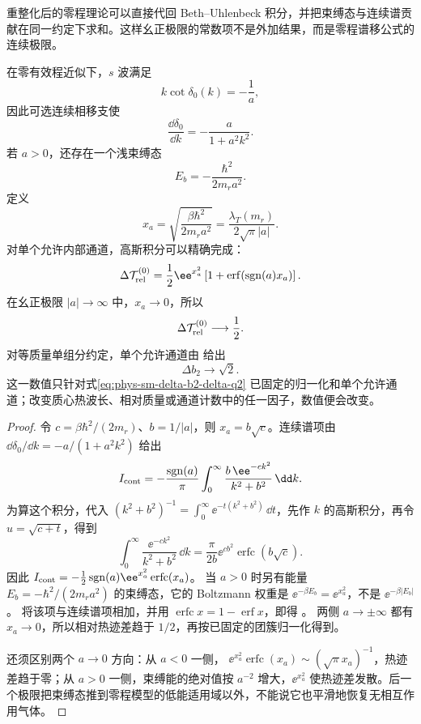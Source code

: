 重整化后的零程理论可以直接代回 Beth--Uhlenbeck 积分，并把束缚态与连续谱贡献在同一约定下求和。这样幺正极限的常数项不是外加结果，而是零程谱移公式的连续极限。

在零有效程近似下，\(s\) 波满足
\[
 k\cot\delta_0(k)=-\frac1a,
\]
因此可选连续相移支使
\[
 \frac{\dd\delta_0}{\dd k}
 =-\frac{a}{1+a^2k^2}.
\]
若 \(a>0\)，还存在一个浅束缚态
\[
 E_b=-\frac{\hbar^2}{2m_r a^2}.
\]
定义
\begin{equation}
 x_a=\sqrt{\frac{\beta\hbar^2}{2m_r a^2}}
 =\frac{\lambda_T(m_r)}{2\sqrt\pi|a|}.
 \label{eq:phys-sm-zero-range-x}
\end{equation}
对单个允许内部通道，高斯积分可以精确完成：
\begin{equation}
 \Delta\mathcal T_{\rm rel}^{(0)}
 =\frac12\ee^{x_a^2}
 \left[1+\operatorname{erf}(\operatorname{sgn}(a)x_a)\right].
 \label{eq:phys-sm-zero-range-bu-closed}
\end{equation}
在幺正极限 \(|a|\to\infty\) 中，\(x_a\to0\)，所以
\begin{equation}
 \Delta\mathcal T_{\rm rel}^{(0)}\longrightarrow\frac12.
 \label{eq:phys-sm-unitary-relative-trace}
\end{equation}
对等质量单组分约定，单个允许通道由 给出
\begin{equation}
 \Delta b_2\longrightarrow\sqrt2.
 \label{eq:phys-sm-unitary-b2-check}
\end{equation}
这一数值只针对式\cref{eq:phys-sm-delta-b2-delta-q2} 已固定的归一化和单个允许通道；改变质心热波长、相对质量或通道计数中的任一因子，数值便会改变。

\begin{proof}
令 \(c=\beta\hbar^2/(2m_r)\)、\(b=1/|a|\)，则 \(x_a=b\sqrt c\)。连续谱项由 \(\dd\delta_0/\dd k=-a/(1+a^2k^2)\) 给出
\[
I_{\rm cont}
=-\frac{\operatorname{sgn}(a)}{\pi}
\int_0^\infty\frac{b\,\ee^{-ck^2}}{k^2+b^2}\,\dd k.
\]
为算这个积分，代入
\((k^2+b^2)^{-1}=\int_0^\infty\ee^{-t(k^2+b^2)}\,\dd t\)，先作 \(k\) 的高斯积分，再令 \(u=\sqrt{c+t}\)，得到
\[
\int_0^\infty\frac{\ee^{-ck^2}}{k^2+b^2}\,\dd k
=\frac{\pi}{2b}\ee^{cb^2}\operatorname{erfc}(b\sqrt c).
\]
因此 \(I_{\rm cont}=-\tfrac12\operatorname{sgn}(a)
\ee^{x_a^2}\operatorname{erfc}(x_a)\)。
当 \(a>0\) 时另有能量 \(E_b=-\hbar^2/(2m_ra^2)\) 的束缚态，它的 Boltzmann 权重是
\(\ee^{-\beta E_b}=\ee^{x_a^2}\)，不是
\(\ee^{-\beta|E_b|}\)。
将该项与连续谱项相加，并用
\(\operatorname{erfc}x=1-\operatorname{erf}x\)，即得
。
两侧 \(a\to\pm\infty\) 都有 \(x_a\to0\)，所以相对热迹差趋于 \(1/2\)，再按已固定的团簇归一化得到。

还须区别两个 \(a\to0\) 方向：从 \(a<0\) 一侧，
\(\ee^{x_a^2}\operatorname{erfc}(x_a)\sim(\sqrt\pi x_a)^{-1}\)，热迹差趋于零；从 \(a>0\) 一侧，束缚能的绝对值按 \(a^{-2}\) 增大，\(\ee^{x_a^2}\) 使热迹差发散。后一个极限把束缚态推到零程模型的低能适用域以外，不能说它也平滑地恢复无相互作用气体。
\end{proof}

